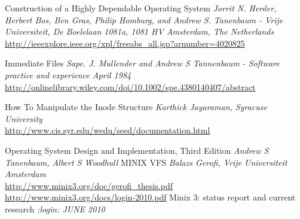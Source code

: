 \cleardoublepage
{}
{}
\begin{thebibliography}{99}

 Construction of a Highly Dependable Operating System { \em Jorrit N. Herder, Herbert Bos, Ben Gras, Philip Homburg, and Andrew S. Tanenbaum - Vrije Universiteit, De Boelelaan 1081a, 1081 HV Amsterdam, The Netherlands } \\ \url{http://ieeexplore.ieee.org/xpl/freeabs_all.jsp?arnumber=4020825}

Immediate Files {\em Sape. J. Mullender and Andrew S Tannenbaum - Software practice and experience April 1984 } \\  \url{http://onlinelibrary.wiley.com/doi/10.1002/spe.4380140407/abstract}

 How To Manipulate the Inode Structure  {\em Karthick Jayaraman, Syracuse University } \\ \url {http://www.cis.syr.edu/wedu/seed/documentation.html}

 Operating System Design and Implementation, Third Edition{ \em Andrew S Tanenbaum, Albert S Woodhull }
 MINIX VFS {\em Balazs Gerofi, Vrije Universiteit Amsterdam } \\ \url {http://www.minix3.org/doc/gerofi_thesis.pdf}
 \url{http://www.minix3.org/docs/login-2010.pdf}
 Minix 3: status report and current research { \em ;login: JUNE 2010 } \\




\end{thebibliography}
